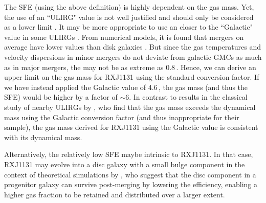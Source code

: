 \documentclass[]{emulateapj}
\begin{document}
The SFE (using the above definition) is highly dependent on the gas mass.
Yet, the use of an ``ULIRG" \alphaco value is not well justified and 
should only be considered as a lower limit .
It may be more appropriate to use an \alphaco closer to the ``Galactic" value in 
some ULIRGs \citep[\eg][]{Papadopoulos12a}. 
From numerical models, it is found that mergers on average have lower \alphaco values than
disk galaxies \citep{Narayanan12a}.
But since the gas temperatures and velocity dispersions in minor mergers do not deviate from 
galactic GMCs as much as in major mergers, the \alphaco may not be as extreme as 0.8\,\alphaU.
Hence,
we can derive an upper limit on the gas mass for RXJ1131 using the standard conversion factor.
If we have instead applied the Galactic value of 4.6\,\alphaU, 
the gas mass (and thus the SFE) would be higher by a factor of $\sim$6. 
In contrast to results in the classical study of nearby ULIRGs by , who find that
the gas mass exceeds the dynamical mass using 
the Galactic conversion factor 
(and thus inappropriate for their sample), the gas mass derived for
RXJ1131 using the Galactic value is consistent with its dynamical mass.

Alternatively, the relatively low SFE maybe intrinsic to RXJ1131.
In that case,  RXJ1131 may evolve into a disc galaxy with a small bulge component
in the context of theoretical simulations by \citet{Hopkins09a}, who suggest 
that the disc component in a progenitor galaxy can survive post-merging
by lowering the \SF efficiency, enabling a higher gas fraction to be retained and 
distributed over a larger extent.
 
\end{document}
